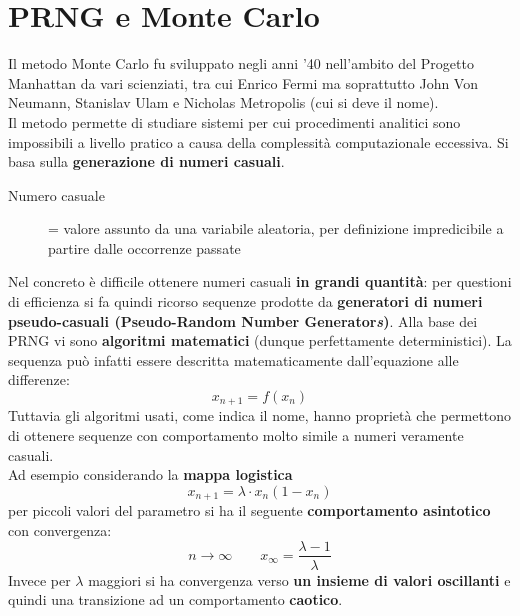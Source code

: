 \documentclass[10pt, oneside]{book}
\begin{document}
\chapter{PRNG e Monte Carlo}
Il metodo Monte Carlo fu sviluppato negli anni '40 nell'ambito del Progetto Manhattan da vari scienziati, tra cui Enrico Fermi ma soprattutto John Von Neumann, Stanislav Ulam e Nicholas Metropolis (cui si deve il nome).\\
Il metodo permette di studiare sistemi per cui procedimenti analitici sono impossibili a livello pratico a causa della complessità computazionale eccessiva. Si basa sulla \textbf{generazione di numeri casuali}.
\begin{description}
\item[Numero casuale] = valore assunto da una variabile aleatoria, per definizione impredicibile a partire dalle occorrenze passate
\end{description}
Nel concreto è difficile ottenere numeri casuali \textbf{in grandi quantità}: per questioni di efficienza si fa quindi ricorso sequenze prodotte da \textbf{generatori di numeri pseudo-casuali (Pseudo-Random Number Generator\textit{s})}. Alla base dei PRNG vi sono \textbf{algoritmi matematici} (dunque perfettamente deterministici). La sequenza può infatti essere descritta matematicamente dall'equazione alle differenze:
\[x_{n+1} = f(x_n)\]
Tuttavia gli algoritmi usati, come indica il nome, hanno proprietà che permettono di ottenere sequenze con comportamento molto simile a numeri veramente casuali.\\
Ad esempio considerando la \textbf{mappa logistica}
\[x_{n+1} = \lambda \cdot x_n (1 - x_n)\]
per piccoli valori del parametro si ha il seguente \textbf{comportamento asintotico} con convergenza:
\[n \rightarrow \infty \qquad x_\infty = \frac{\lambda - 1}{\lambda}\]
Invece per $\lambda$ maggiori si ha convergenza verso \textbf{un insieme di valori oscillanti} e quindi una transizione ad un comportamento \textbf{caotico}.
\end{document}
